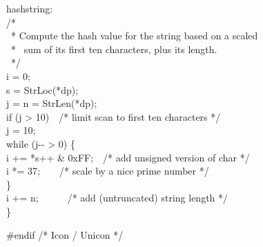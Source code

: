 %
\begin{iconcode}
\>hashstring:\\
\>\>/*\\
\>\>\ * Compute the hash value for the string based on a scaled \\
\>\>\ * \ sum of its first ten characters, plus its length.\\
\>\>\ */\\
\>\>i = 0;\\
\>\>s = StrLoc(*dp);\\
\>\>j = n = StrLen(*dp);\\
\>\>if (j > 10)\ \ /* limit scan to first ten characters */\\
\>\>\>j = 10;\\
\>\>while (j-{}- > 0) \{\\
\>\>\>i += *s++ \& 0xFF;\ \ /* add unsigned version of char */\\
\>\>\>i *= 37;\ \ \ \ /* scale by a nice prime number */\\
\>\>\}\\
\>\>i += n;\ \ \ \ \ \ /* add (untruncated) string length */\\
\>\>\}\\
\end{iconcode}
%
\begin{specialcode}{\tt\color{blue}}
\#endif\>\>\> /* Icon / Unicon */\\
\end{specialcode}
%
